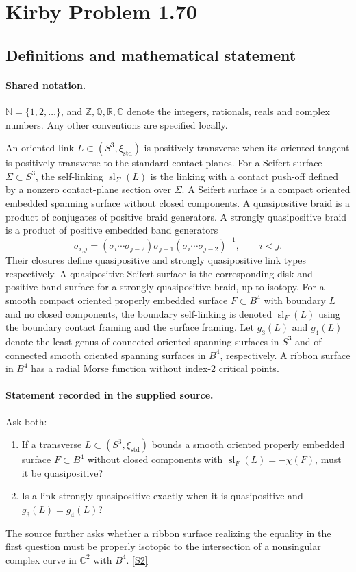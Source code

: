 \documentclass[11pt]{article}
\newcommand{\sref}[2]{\hyperlink{source:#1:#2}{[S#2]}}
\begin{document}
\section{Kirby Problem 1.70}\label{statement}

\subsection{Definitions and mathematical statement}

\paragraph{Shared notation.}$\mathbb N=\{1,2,\ldots\}$, and $\mathbb Z,\mathbb Q,\mathbb R,\mathbb C$ denote the integers, rationals, reals and complex numbers. Any other conventions are specified locally.


An oriented link $L\subset(S^3,\xi_{\mathrm{std}})$ is positively transverse when its oriented tangent is positively transverse to the standard contact planes. For a Seifert surface $\Sigma\subset S^3$, the self-linking $\operatorname{sl}_\Sigma(L)$ is the linking with a contact push-off defined by a nonzero contact-plane section over $\Sigma$. A Seifert surface is a compact oriented embedded spanning surface without closed components. A quasipositive braid is a product of conjugates of positive braid generators. A strongly quasipositive braid is a product of positive embedded band generators
\[\sigma_{i,j}=(\sigma_i\cdots\sigma_{j-2})\sigma_{j-1}(\sigma_i\cdots\sigma_{j-2})^{-1},\qquad i<j.\]
Their closures define quasipositive and strongly quasipositive link types respectively. A quasipositive Seifert surface is the corresponding disk-and-positive-band surface for a strongly quasipositive braid, up to isotopy. For a smooth compact oriented properly embedded surface $F\subset B^4$ with boundary $L$ and no closed components, the boundary self-linking is denoted $\operatorname{sl}_F(L)$ using the boundary contact framing and the surface framing. Let $g_3(L)$ and $g_4(L)$ denote the least genus of connected oriented spanning surfaces in $S^3$ and of connected smooth oriented spanning surfaces in $B^4$, respectively. A ribbon surface in $B^4$ has a radial Morse function without index-2 critical points.
\paragraph{Statement recorded in the supplied source.}
Ask both:
\begin{enumerate}
\item If a transverse $L\subset(S^3,\xi_{\mathrm{std}})$ bounds a smooth oriented properly embedded surface $F\subset B^4$ without closed components with $\operatorname{sl}_F(L)=-\chi(F)$, must it be quasipositive?
\item Is a link strongly quasipositive exactly when it is quasipositive and $g_3(L)=g_4(L)$?
\end{enumerate}
The source further asks whether a ribbon surface realizing the equality in the first question must be properly isotopic to the intersection of a nonsingular complex curve in $\mathbb C^2$ with $B^4$. \sref{statement}{2}
\end{document}
